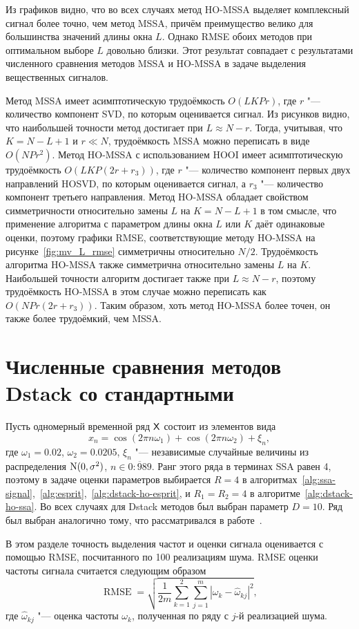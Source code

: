 \documentclass[specialist,
  substylefile=spbu_report.rtx,
subf,href,colorlinks=true, 12pt]{disser}
\theoremstyle{plain}
\theoremstyle{definition}
\theoremstyle{remark}
\begin{document}
Из графиков видно, что во всех случаях метод HO-MSSA выделяет
комплексный сигнал более точно, чем метод MSSA,
причём преимущество велико для большинства значений длины окна $L$.
Однако RMSE обоих методов при оптимальном выборе $L$ довольно близки.
Этот результат совпадает с результатами численного сравнения методов MSSA и
HO-MSSA в задаче выделения вещественных сигналов.

Метод MSSA имеет асимптотическую трудоёмкость $O(LKPr)$, где
$r$ "--- количество компонент SVD, по которым оценивается сигнал.
Из рисунков видно, что наибольшей точности метод достигает при
$L \approx N-r$.
Тогда, учитывая, что $K=N - L + 1$ и $r\ll N$, трудоёмкость MSSA
можно переписать в виде $O(NPr^2)$.
Метод HO-MSSA с использованием HOOI имеет асимптотическую
трудоёмкость $O(LKP(2r+r_3))$, где $r$ "--- количество
компонент первых двух направлений HOSVD,
по которым оценивается сигнал, а $r_3$ "--- количество компонент
третьего направления.
Метод HO-MSSA обладает свойством симметричности относительно
замены $L$ на $K=N-L+1$ в том смысле, что применение алгоритма
с параметром длины окна $L$ или $K$ даёт одинаковые оценки,
поэтому графики RMSE, соответствующие методу HO-MSSA
на рисунке~\ref{fig:mv_L_rmse} симметричны относительно $N/2$.
Трудоёмкость алгоритма HO-MSSA также симметрична относительно
замены $L$ на $K$.
Наибольшей точности алгоритм достигает также при
$L\approx N - r$, поэтому трудоёмкость HO-MSSA в этом случае можно переписать
как $O(NPr(2r+r_3))$.
Таким образом, хоть метод HO-MSSA более точен, он также более
трудоёмкий, чем MSSA.

\section{Численные сравнения методов Dstack со
стандартными}\label{sec:dstack-comparison}
Пусть одномерный временной ряд $\mathsf{X}$ состоит из элементов вида
\[
  x_n = \cos\left(2 \pi n \omega_1\right) + \cos\left(2 \pi n
  \omega_2\right) + \xi_n,
\]
где $\omega_1 = 0.02$, $\omega_2 = 0.0205$, $\xi_n$ "--- независимые
случайные величины из распределения $\mathrm{N}(0, \sigma^2)$, $n \in
\overline{0:989}$.
Ранг этого ряда в терминах SSA равен 4, поэтому в задаче оценки
параметров выбирается $R=4$ в
алгоритмах~\ref{alg:ssa-signal},~\ref{alg:esprit},~\ref{alg:dstack-ho-esprit},
и $R_1=R_2 = 4$ в алгоритме~\ref{alg:dstack-ho-ssa}.
Во всех случаях для Dstack методов был выбран параметр $D=10$.
Ряд был выбран аналогично тому, что рассматривался в работе~\cite{Papy2009}.

В этом разделе точность выделения частот и оценки сигнала
оценивается с помощью RMSE, посчитанного по 100 реализациям шума.
RMSE оценки частоты сигнала считается следующим образом
\begin{equation}
  \label{eq:rmse-estim}
  \operatorname{RMSE} =\sqrt{\frac{1}{2m}
    \sum_{k=1}^{2}\sum_{j=1}^{m}
  \left|\omega_{k}-\widehat{\omega}_{kj}\right|^2},
\end{equation}
где $\widehat{\omega}_{kj}$ "--- оценка частоты $\omega_k$, полученная по ряду
с $j$-й реализацией шума.
\end{document}
